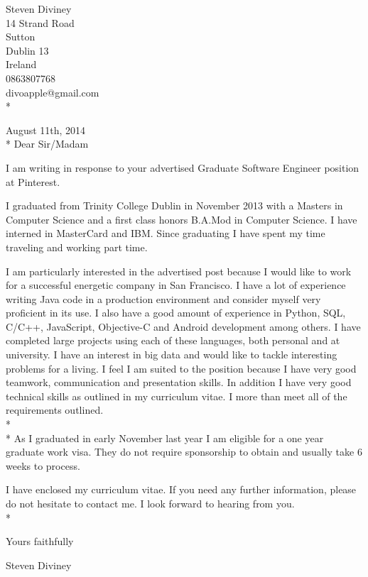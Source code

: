 \documentclass{res}
\begin{document}
 
\begin{resume}

\begin{flushright}
   Steven Diviney \\
   14 Strand Road \\
   Sutton \\
   Dublin 13 \\
   Ireland \\
   0863807768 \\
   divoapple@gmail.com \\* \vspace{10 mm}
\end{flushright}
\begin{flushleft}
 
August 11th, 2014\\*\vspace{10 mm}
Dear Sir/Madam
\end{flushleft}
I am writing in response to your advertised Graduate Software Engineer position at Pinterest.

I graduated from Trinity College Dublin in November 2013 with a Masters in Computer Science and a first class honors B.A.Mod in Computer Science. I have interned in MasterCard and IBM. Since graduating I have spent my time traveling and working part time.

I am particularly interested in the advertised post because I would like to work for a successful energetic company in San Francisco. I have a lot of experience writing Java code in a production environment and consider myself very proficient in its use. I also have a good amount of experience in Python, SQL, C/C++, JavaScript, Objective-C and Android development among others. I have completed large projects using each of these languages, both personal and at university. I have an interest in big data and would like to tackle interesting problems for a living.
I feel I am suited to the position because I have very good teamwork, communication and presentation skills. In addition I have very good technical skills as outlined in my curriculum vitae. I more than meet all of the requirements outlined.
\\*
\\*
As I graduated in early November last year I am eligible for a one year graduate work visa. They do not require sponsorship to obtain and usually take 6 weeks to process.

I have enclosed my curriculum vitae. If you need any further information, please do not hesitate to contact me. I look forward to hearing from you.\\*

\begin{flushleft}
Yours faithfully\\\vspace{10mm}

Steven Diviney\\
\end{flushleft}

\end{resume}
\end{document}
